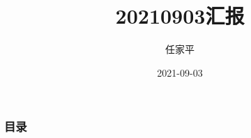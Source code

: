 \documentclass[12pt, utf-8]{beamer}
\title{20210903汇报}
\author{任家平}
\institute{同济大学测绘与地理信息学院}
\date{2021-09-03}
\begin{document}
\begin{frame}
    \titlepage
\end{frame}

\begin{frame}
    \frametitle{目录}
    \tableofcontents
\end{frame}






% 
\end{document}
